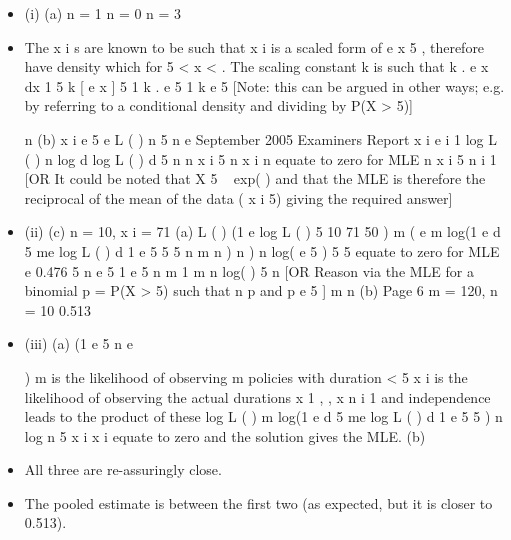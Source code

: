 \documentclass[a4paper,12pt]{article}
\begin{document}
\begin{itemize}
\item (i) (a)
n = 1
n = 0
n = 3
\item The x i s are known to be such that x i is a scaled form of e
x
5 , therefore have density which
for 5 < x < .
The scaling constant k is such that
k . e
x
dx 1
5
k [ e
x
] 5
1
k . e
5
1
k
e 5
[Note: this can be argued in other ways; e.g. by referring to a conditional density and dividing by P(X > 5)]

n
(b)
x i
e 5 e
L ( )
n 5 n
e
September 2005
Examiners Report
x i
e
i 1
log L ( )
n log
d
log L ( )
d
5 n
n
x i
5 n
x i
n
equate to zero for MLE
n
x i 5 n
i 1
[OR It could be noted that X 5 ~ exp( ) and that the MLE is
therefore the reciprocal of the mean of the data ( x i 5) giving the required answer]
\item (ii)
(c) n = 10, x i = 71
(a) L ( ) (1 e
log L ( )
5
10
71 50
) m ( e
m log(1 e
d
5 me
log L ( )
d
1 e
5
5
5
n
m n
) n
) n log( e
5
)
5
5
equate to zero for MLE
e
0.476
5 n
e
5
1 e
5
n
m
1
m n
log(
)
5
n
[OR Reason via the MLE for a binomial p = P(X > 5) such that
n
p
and p e 5 ]
m n
(b)
Page 6
m = 120, n = 10
0.513
\item (iii)
(a)
(1 e
5
n
e

) m is the likelihood of observing m policies with duration < 5
x i
is the likelihood of observing the actual durations x 1 ,
, x n
i 1
and independence leads to the product of these
log L ( )
m log(1 e
d
5 me
log L ( )
d
1 e
5
5
) n log
n
5
x i
x i
equate to zero and the solution gives the MLE.
(b)
\item All three are re-assuringly close.
\item The pooled estimate is between the first two (as expected, but it is closer to 0.513).
\end{itemize}
\end{document}
